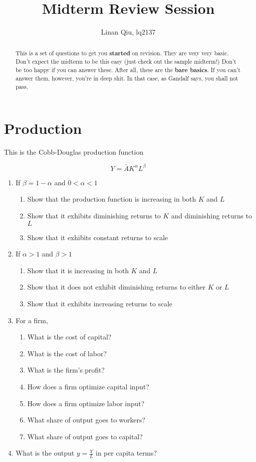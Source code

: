 \documentclass[11pt]{scrartcl}
\title{Midterm Review Session}
\author{Linan Qiu, lq2137}
\begin{document}
\maketitle

\begin{abstract}
This is a set of questions to get you \textbf{started} on revision. They are very very basic. Don't expect the midterm to be this easy (just check out the sample midterm!) Don't be too happy if you can answer these. After all, these are the \textbf{bare basics}. If you can't answer them, however, you're in deep shit. In that case, as Gandalf says, you shall not pass.
\end{abstract}

\section{Production}

This is the Cobb-Douglas production function

\[Y = \bar{A}K^\alpha L^{\beta} \]

\begin{enumerate}
\item If $\beta = 1- \alpha$ and $0 < \alpha < 1$
\begin{enumerate}
\item Show that the production function is increasing in both $K$ and $L$
\item Show that it exhibits diminishing returns to $K$ and diminishing returns to $L$
\item Show that it exhibits constant returns to scale
\end{enumerate}
\item If $\alpha > 1$ and $\beta > 1$
\begin{enumerate}
\item Show that it is increasing in both $K$ and $L$
\item Show that it does not exhibit diminishing returns to either $K$ or $L$
\item Show that it exhibits increasing returns to scale
\end{enumerate}
\item For a firm,
\begin{enumerate}
\item What is the cost of capital?
\item What is the cost of labor?
\item What is the firm's profit?
\item How does a firm optimize capital input?
\item How does a firm optimize labor input?
\item What share of output goes to workers?
\item What share of output goes to capital?
\end{enumerate}
\item What is the output $y = \frac{Y}{L}$ in per capita terms?
\end{enumerate}
\end{document}

